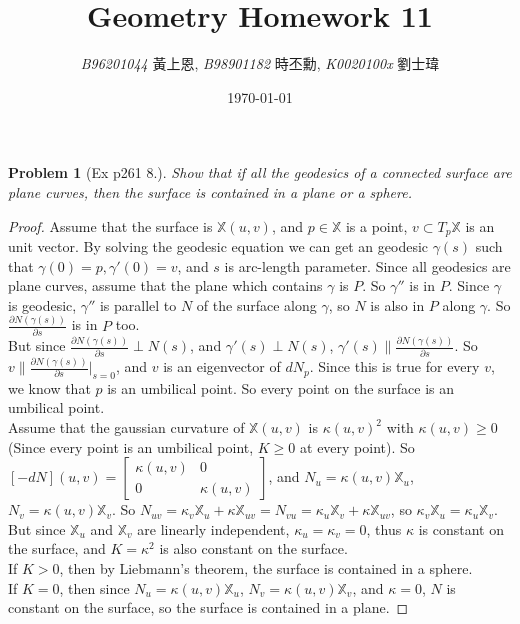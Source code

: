 \documentclass[10pt,a4paper]{article}
\newcommand{\LiHei}{\CJKfamily{lh}}
\newcounter{theProblemCounter}
\newtheorem{problem}[theProblemCounter]{Problem}
\begin{document}
\title{{Geometry Homework 11}}
\author{{\it{B96201044}} {\LiHei 黃上恩}, {\it{B98901182}} {\LiHei 時丕勳}, {\it{K0020100x}} {\LiHei 劉士瑋}}
\date{\today}
\maketitle

\newcommand{\bx}{\mathbb{X}}
\newcommand{\bfx}{\mathbf{x}}
\newcommand{\grad}{\textrm{grad }}
\newcommand{\sech}{\mbox{sech}}

\setcounter{theProblemCounter}{3}
\begin{problem}[Ex p261 8.]
Show that if all the geodesics of a connected surface are plane curves, then the surface is contained in a plane or a sphere.
\end{problem}
\begin{proof}
Assume that the surface is $\bx(u,v)$, and $p\in\bx$ is a point, $v\subset T_p\bx$ is an unit vector. By solving the geodesic equation we can get an geodesic $\gamma(s)$ such that $\gamma(0)=p, \gamma'(0)=v$, and $s$ is arc-length parameter. Since all geodesics are plane curves, assume that the plane which contains $\gamma$ is $P$. So $\gamma''$ is in $P$. Since $\gamma$ is geodesic, $\gamma''$ is parallel to $N$ of the surface along $\gamma$, so $N$ is also in $P$ along $\gamma$. So $\frac{\partial N(\gamma(s))}{\partial s}$ is in $P$ too.\\
But since $\frac{\partial N(\gamma(s))}{\partial s}\perp N(s)$, and $\gamma'(s)\perp N(s)$, $\gamma'(s)\parallel \frac{\partial N(\gamma(s))}{\partial s}$. So $v\parallel \frac{\partial N(\gamma(s))}{\partial s}\Big|_{s=0}$, and $v$ is an eigenvector of $dN_p$. Since this is true for every $v$, we know that $p$ is an umbilical point. So every point on the surface is an umbilical point.\\
Assume that the gaussian curvature of $\bx(u,v)$ is $\kappa(u,v)^2$ with $\kappa(u,v)\ge 0$ (Since every point is an umbilical point, $K\ge 0$ at every point). So $[-dN](u,v)=\begin{bmatrix}\kappa(u,v) & 0\\0 & \kappa(u,v)\end{bmatrix}$, and $N_u=\kappa(u,v)\bx_u$, $N_v=\kappa(u,v)\bx_v$. So $N_{uv}=\kappa_v\bx_u+\kappa\bx_{uv}=N_{vu}=\kappa_u\bx_v+\kappa\bx_{uv}$, so $\kappa_v\bx_u=\kappa_u\bx_v$. But since $\bx_u$ and $\bx_v$ are linearly independent, $\kappa_u=\kappa_v=0$, thus $\kappa$ is constant on the surface, and $K=\kappa^2$ is also constant on the surface.\\
If $K>0$, then by Liebmann's theorem, the surface is contained in a sphere.\\
If $K=0$, then since $N_u=\kappa(u,v)\bx_u$, $N_v=\kappa(u,v)\bx_v$, and $\kappa=0$, $N$ is constant on the surface, so the surface is contained in a plane.
\end{proof}
\end{document}

